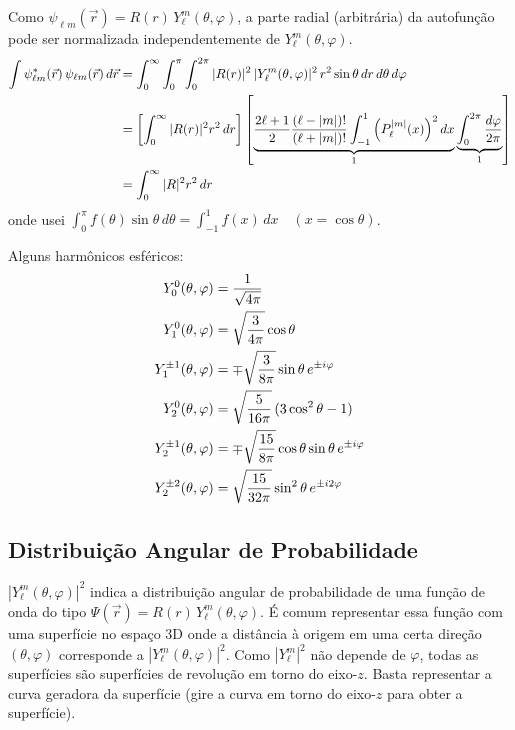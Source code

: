 Como $\psi_{\ell m}(\vec{r}) = R(r)\, Y_\ell^m(\theta,\varphi)$, a parte radial (arbitrária) da autofunção pode ser normalizada independentemente de $Y_\ell^m(\theta,\varphi)$.
\begin{align}
    \int \psi_{\ell m}^*(\vec{r})\, \psi_{\ell m}(\vec{r}) \, d\vec{r}
    &= \int_0^\infty \int_0^\pi \int_0^{2\pi} |R(r)|^2 \, |Y_\ell^m(\theta,\varphi)|^2 \, r^2 \sin\theta \, dr\, d\theta\, d\varphi \label{eq:aula19_normalizacao_1} \\
    &= \left[ \int_0^\infty |R(r)|^2 r^2 \, dr \right]
    \left[ \underbrace{\frac{2\ell+1}{2}\frac{(\ell-|m|)!}{(\ell+|m|)!} \int_{-1}^{1} \left(P_\ell^{|m|}(x)\right)^2 dx}_{1}
    \underbrace{\int_0^{2\pi} \frac{d\varphi}{2\pi}}_{1} \right] \notag \\
    &= \int_0^\infty |R|^2 r^2 \, dr
\label{eq:aula19_normalizacao_2}
\end{align}
onde usei $\displaystyle\int_0^\pi f(\theta)\sin\theta\, d\theta = \int_{-1}^{1} f(x)\, dx \quad (x=\cos\theta)$.

Alguns harmônicos esféricos:
\begin{align}
    Y_0^0(\theta,\varphi) &= \frac{1}{\sqrt{4\pi}} \notag \\
    Y_1^0(\theta,\varphi) &= \sqrt{\frac{3}{4\pi}}\cos\theta \notag \\
    Y_1^{\pm1}(\theta,\varphi) &= \mp\sqrt{\frac{3}{8\pi}}\sin\theta\, e^{\pm i\varphi} \notag \\
    Y_2^0(\theta,\varphi) &= \sqrt{\frac{5}{16\pi}}\,(3\cos^2\theta - 1) \notag \\
    Y_2^{\pm1}(\theta,\varphi) &= \mp\sqrt{\frac{15}{8\pi}}\cos\theta\sin\theta\, e^{\pm i\varphi} \notag \\
    Y_2^{\pm2}(\theta,\varphi) &= \sqrt{\frac{15}{32\pi}}\sin^2\theta\, e^{\pm i2\varphi}
\label{eq:aula19_tabela_harmonicos}
\end{align}

\subsection*{Distribuição Angular de Probabilidade}

$|Y_\ell^m(\theta,\varphi)|^2$ indica a distribuição angular de probabilidade de uma função de onda do tipo $\Psi(\vec{r}) = R(r)\, Y_\ell^m(\theta,\varphi)$. É comum representar essa função com uma superfície no espaço 3D onde a distância à origem em uma certa direção $(\theta,\varphi)$ corresponde a $|Y_\ell^m(\theta,\varphi)|^2$. Como $|Y_\ell^m|^2$ não depende de $\varphi$, todas as superfícies são superfícies de revolução em torno do eixo-$z$. Basta representar a curva geradora da superfície (gire a curva em torno do eixo-$z$ para obter a superfície).

